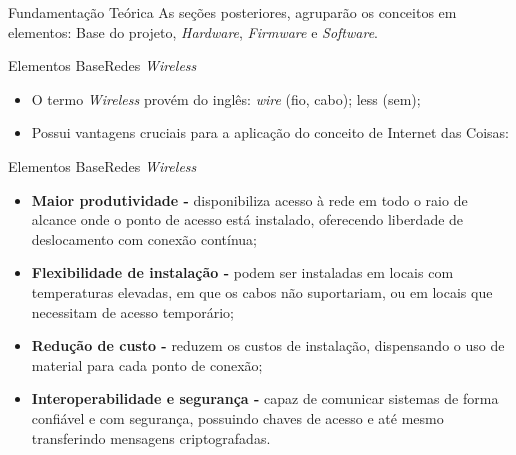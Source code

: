 \begin{frame}{Fundamentação Teórica}
    As seções posteriores, agruparão os conceitos em elementos: Base do projeto, \textit{Hardware}, \textit{Firmware} e \textit{Software}.  
\end{frame}

\begin{frame}{Elementos Base}{Redes \textit{Wireless}}
      
\begin{itemize}
    \item O termo \textit{Wireless} provém do inglês: \textit{wire} (fio, cabo); less (sem);
    \medskip
    \item Possui vantagens cruciais para a aplicação do conceito de Internet das Coisas:
\end{itemize}    

\end{frame}

\begin{frame}{Elementos Base}{Redes \textit{Wireless}}
      
    \begin{itemize}
        \item \textbf{Maior produtividade - } disponibiliza acesso à rede em todo o raio de alcance onde o ponto de acesso está instalado, oferecendo liberdade de deslocamento com conexão contínua;
	
        \item \textbf{Flexibilidade de instalação -} podem ser instaladas em locais com temperaturas elevadas, em que os cabos não suportariam, ou em locais que necessitam de acesso temporário;
        
        \item \textbf{Redução de custo - } reduzem os custos de instalação, dispensando o uso de material para cada ponto de conexão;
        
        \item \textbf{Interoperabilidade e segurança - } capaz de comunicar sistemas de forma confiável e com segurança, possuindo chaves de acesso e até mesmo transferindo mensagens criptografadas.   
    \end{itemize}    
    
\end{frame}

